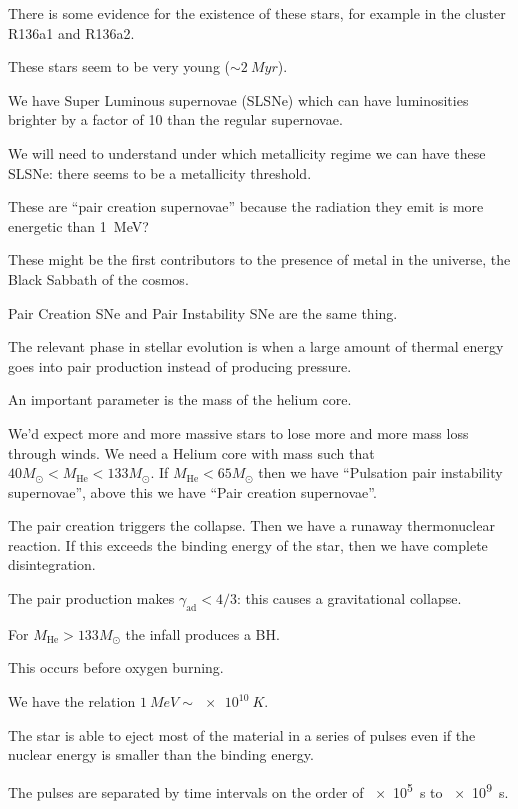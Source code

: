 \documentclass[main.tex]{subfiles}
\begin{document}
There is some evidence for the existence of these stars, for example in the cluster R136a1  and R136a2. 

These stars seem to be very young (\(\sim \SI{2}{Myr}\)). 

We have Super Luminous supernovae (SLSNe) which can have luminosities brighter by a factor of 10 than the regular supernovae. 

We will need to understand under which metallicity regime we can have these SLSNe: there seems to be a metallicity threshold.  

These are ``pair creation supernovae'' because the radiation they emit is more energetic than \SI{1}{MeV}? 

These might be the first contributors to the presence of metal in the universe, the Black Sabbath of the cosmos. 

Pair Creation SNe and Pair Instability SNe are the same thing. 

The relevant phase in stellar evolution is when a large amount of thermal energy goes into pair production instead of producing pressure. 

An important parameter is the mass of the helium core. 

We'd expect more and more massive stars to lose more and more mass loss through winds. 
We need a Helium core with mass such that \(40 M_{\odot} < M _{\text{He}} < 133 M_{\odot}\). If \(M _{\text{He}} < 65 M_{\odot}\) then we have ``Pulsation pair instability supernovae'', above this we have ``Pair creation supernovae''. 

The pair creation triggers the collapse. Then we have a runaway thermonuclear reaction. If this exceeds the binding energy of the star, then we have complete disintegration. 


The pair production makes \(\gamma _{\text{ad}} < 4/3\): this causes a gravitational collapse. 

For \(M _{\text{He}} > 133 M_{\odot}\) the infall produces a BH.

This occurs before oxygen burning. 

We have the relation \(\SI{1}{MeV} \sim \SI{e10}{K}\). 

The star is able to eject most of the material in a series of pulses even if the nuclear energy is smaller than the binding energy. 

The pulses are separated by time intervals on the order of \SI{e5}{s} to \SI{e9}{s}.  
\end{document}
